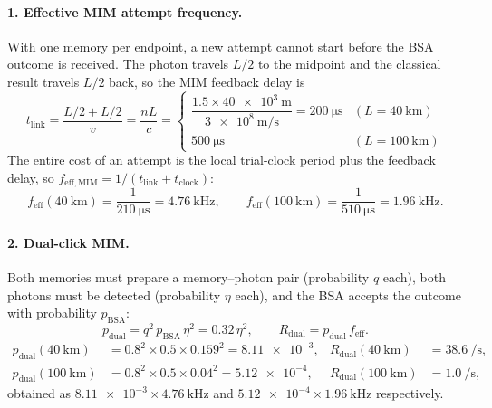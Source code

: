 \paragraph{1. Effective MIM attempt frequency.}
With one memory per endpoint, a new attempt cannot start before the BSA outcome is received.
The photon travels $L/2$ to the midpoint and the classical result travels $L/2$ back, so the
MIM feedback delay is
\begin{equation}
  t_\mathrm{link} = \frac{L/2 + L/2}{v} = \frac{nL}{c}
  = \begin{cases}
      \dfrac{1.5\times\SI{40e3}{\metre}}{\SI{3e8}{\metre\per\second}} = \SI{200}{\micro\second} & (L=\SI{40}{\kilo\metre})\\[2ex]
      \SI{500}{\micro\second} & (L=\SI{100}{\kilo\metre})
    \end{cases}
\end{equation}
The entire cost of an attempt is the local trial-clock period plus the feedback delay, so
$f_\mathrm{eff,MIM} = 1/(t_\mathrm{link} + t_\mathrm{clock})$:
\begin{equation}
  f_\mathrm{eff}(\SI{40}{\kilo\metre}) = \frac{1}{\SI{210}{\micro\second}} = \SI{4.76}{\kilo\hertz},
  \qquad
  f_\mathrm{eff}(\SI{100}{\kilo\metre}) = \frac{1}{\SI{510}{\micro\second}} = \SI{1.96}{\kilo\hertz}.
\end{equation}

\paragraph{2. Dual-click MIM.}
Both memories must prepare a memory--photon pair (probability $q$ each), both photons must be
detected (probability $\eta$ each), and the BSA accepts the outcome with probability $p_\mathrm{BSA}$:
\begin{equation}
  p_\mathrm{dual} = q^2\, p_\mathrm{BSA}\, \eta^2 = 0.32\,\eta^2,
  \qquad R_\mathrm{dual} = p_\mathrm{dual}\, f_\mathrm{eff}.
\end{equation}
\begin{align}
  p_\mathrm{dual}(\SI{40}{\kilo\metre}) &= 0.8^2\times0.5\times0.159^2 = \num{8.11e-3},
  & R_\mathrm{dual}(\SI{40}{\kilo\metre}) &= \SI{38.6}{\per\second},\\
  p_\mathrm{dual}(\SI{100}{\kilo\metre}) &= 0.8^2\times0.5\times0.04^2 = \num{5.12e-4},
  & R_\mathrm{dual}(\SI{100}{\kilo\metre}) &= \SI{1.0}{\per\second},
\end{align}
obtained as $\num{8.11e-3}\times\SI{4.76}{\kilo\hertz}$ and $\num{5.12e-4}\times\SI{1.96}{\kilo\hertz}$ respectively.

